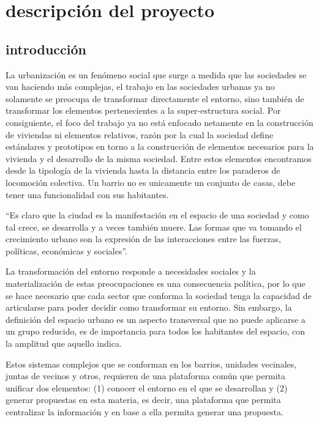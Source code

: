 \documentclass[12pt]{article}
\begin{document}
\newpage
\section{descripción del proyecto}

\subsection{introducción}

La urbanización es un fenómeno social que surge a medida que las sociedades se
van haciendo más complejas, el trabajo en las sociedades urbanas ya no solamente
se preocupa de transformar directamente el entorno, sino también de transformar
los elementos pertenecientes a la super-estructura social. Por consiguiente, el
foco del trabajo ya no está enfocado netamente en la construcción de viviendas
ni elementos relativos, razón por la cual la sociedad define estándares y
prototipos en torno a la construcción de elementos necesarios para la vivienda y
el desarrollo de la misma sociedad. Entre estos elementos encontramos desde la
tipología de la vivienda hasta la distancia entre los paraderos de locomoción
colectiva. Un barrio no es unicamente un conjunto de casas, debe tener una
funcionalidad con sus habitantes. 

``Es claro que la ciudad es la manifestación en el espacio de una
sociedad y como tal crece, se desarrolla y a veces también muere.
Las formas que va tomando el crecimiento urbano son la expresión de las interacciones entre las
fuerzas, políticas, económicas y sociales''.\cite{Mar13}

La transformación del entorno responde a necesidades sociales y la
materialización de estas preocupaciones es una consecuencia política, por lo que
se hace necesario que cada sector que conforma la sociedad tenga la capacidad de
articularse para poder decidir como transformar su entorno. Sin embargo, la
definición del espacio urbano es un aspecto transversal que no puede aplicarse a
un grupo reducido, es de importancia para todos los habitantes del espacio, con la
amplitud que aquello indica. 

Estos sistemas complejos que se conforman en los barrios, unidades vecinales,
juntas de vecinos y otros, requieren de una plataforma común que permita
unificar dos elementos: (1) conocer el entorno en el que se desarrollan y (2) generar
propuestas en esta materia, es decir, una plataforma que permita centralizar la
información y en base a ella permita generar una propuesta.\cite{Pav08}
\end{document}
